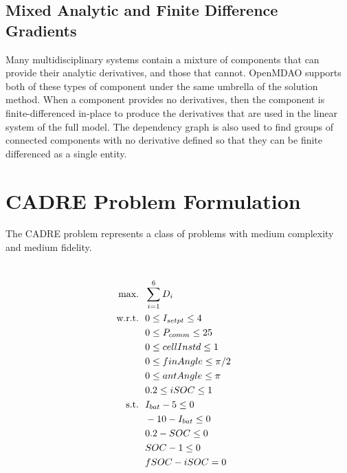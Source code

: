 \documentclass[]{aiaa-tc} %
\newcommand{\txt}{\textrm}
\begin{document}
    
    \subsection{Mixed Analytic and Finite Difference Gradients}
    
    Many multidisciplinary systems contain a mixture of components that can provide their analytic derivatives, and
    those that cannot. OpenMDAO supports both of these types of component under the same umbrella of the
    solution method. When a component provides no derivatives, then the component is finite-differenced in-place to
    produce the derivatives that are used in the linear system of the full model. The dependency graph is also used
    to find groups of connected components with no derivative defined so that they can be finite differenced as a single entity. 
    
  \section{CADRE Problem Formulation}

  The CADRE problem represents a class of problems with medium complexity and medium fidelity. 

    \begin{align}
        \\\txt{max.} &\ \ \sum_{i=1}^6 D_i \notag
        \\\txt{w.r.t.} & \ \ 0 \le I_{setpt} \le 4 \notag
        \\     & \ \ 0 \le P_{comm} \le 25 \notag
        \\     & \ \ 0 \le cellInstd \le 1 \notag
        \\     & \ \ 0 \le finAngle \le \pi/2 \notag
        \\     & \ \ 0 \le antAngle \le \pi \notag
        \\     & \ \ 0.2 \le iSOC \le 1 \notag
        \\\txt{s.t.} & \ \ I_{bat} - 5 \le 0 \notag
        \\     & \ \ -10 - I_{bat} \le 0 \notag
        \\     & \ \ 0.2 - SOC \le 0 \notag
        \\     & \ \ SOC - 1 \le 0 \notag
        \\     & \ \ fSOC - iSOC = 0 \notag
        \label{eqn:sellar_formulation}
    \end{align}
\end{document}
